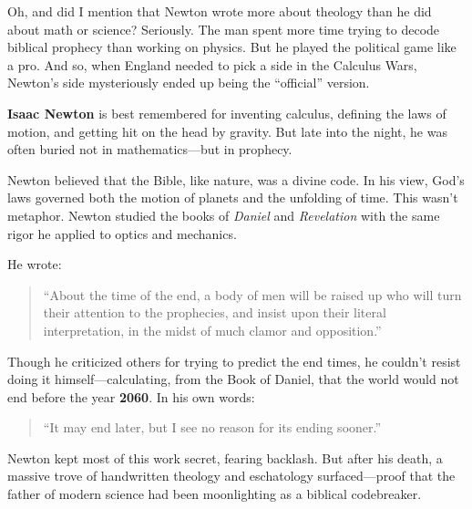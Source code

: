 Oh, and did I mention that Newton wrote more about theology than he did about math or science? Seriously. The man spent more time trying to decode biblical prophecy than working on physics. But he played the political game like a pro. And so, when England needed to pick a side in the Calculus Wars, Newton’s side mysteriously ended up being the ``official'' version. 

\medskip

\begin{tcolorbox}[
  title={Historical Sidebar: Newton’s Other Code — The Book of Revelation},
  colback=gray!5!white,
  colframe=black,
  fonttitle=\bfseries,
  width=\textwidth,
  boxsep=5pt,
  arc=2mm,
  before skip=10pt,
  after skip=10pt
]
\textbf{Isaac Newton} is best remembered for inventing calculus, defining the laws of motion, and getting hit on the head by gravity. But late into the night, he was often buried not in mathematics—but in prophecy.

Newton believed that the Bible, like nature, was a divine code. In his view, God’s laws governed both the motion of planets and the unfolding of time. This wasn’t metaphor. Newton studied the books of \textit{Daniel} and \textit{Revelation} with the same rigor he applied to optics and mechanics.

He wrote:

\begin{quote}
\small
“About the time of the end, a body of men will be raised up who will turn their attention to the prophecies, and insist upon their literal interpretation, in the midst of much clamor and opposition.”
\end{quote}

Though he criticized others for trying to predict the end times, he couldn’t resist doing it himself—calculating, from the Book of Daniel, that the world would not end before the year \textbf{2060}. In his own words:

\begin{quote}
\small
“It may end later, but I see no reason for its ending sooner.”
\end{quote}

Newton kept most of this work secret, fearing backlash. But after his death, a massive trove of handwritten theology and eschatology surfaced—proof that the father of modern science had been moonlighting as a biblical codebreaker.

\end{tcolorbox}

\medskip

